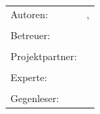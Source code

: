 \begin{titlepage}
    \begin{center}



    	\Huge
    	\textbf{\thesisTitle} \\
    	\textbf{\thesisSubject} \\[10mm]






    	\LARGE
    	\thesisDepartment\\
    	\thesisUniversity\\[10mm]

    	\thesisPeriod \\[15mm]


    	\vfill



    \end{center}

\begin{tabularx}{\textwidth}{l X}
			\large Autoren: & \large{ \thesisAuthorA, \thesisAuthorB} \tabularnewline
			\tabularnewline
			\large Betreuer: & \large{\thesisAdvisor} \tabularnewline
			\tabularnewline
			\large Projektpartner: & \large \thesisPartner \tabularnewline
			 \tabularnewline
			\large Experte: & \large \thesisExpert \tabularnewline
			\tabularnewline
			\large Gegenleser: & \large \thesisReader
		\end{tabularx}

\end{titlepage}
